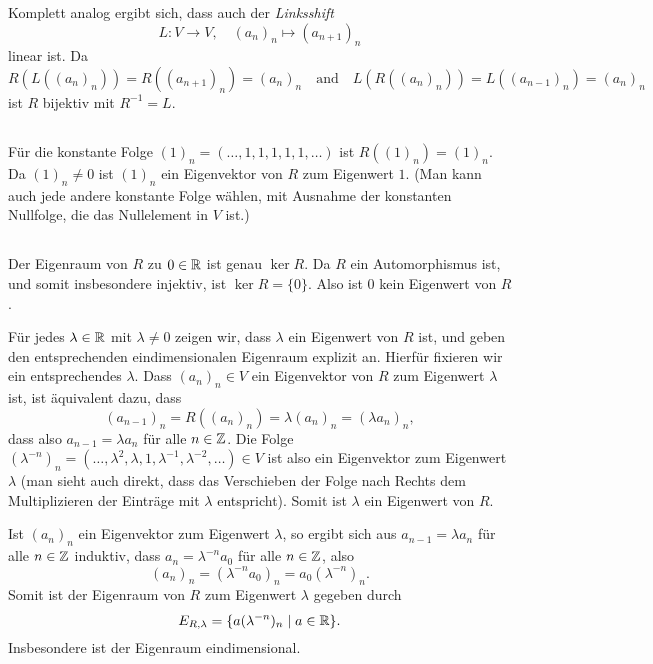 \documentclass[a4paper,10pt]{article}
\begin{document}
Komplett analog ergibt sich, dass auch der \emph{Linksshift}
\[
 L \colon V \to V, \quad (a_n)_n \mapsto (a_{n+1})_n
\]
linear ist. Da
\[
 R(L((a_n)_n))
 = R((a_{n+1})_n)
 = (a_n)_n
 \quad\text{and}\quad
 L(R((a_n)_n))
 = L((a_{n-1})_n)
 = (a_n)_n
\]
ist $R$ bijektiv mit $R^{-1} = L$.


\subsection{}
Für die konstante Folge $(1)_n = (\dotsc,1,1,1,1,1,\dotsc)$ ist $R((1)_n) = (1)_n$. Da $(1)_n \neq 0$ ist $(1)_n$ ein Eigenvektor von $R$ zum Eigenwert $1$. (Man kann auch jede andere konstante Folge wählen, mit Ausnahme der konstanten Nullfolge, die das Nullelement in $V$ ist.)


\subsection{}
Der Eigenraum von $R$ zu $0 \in \mathbb{R}$ ist genau $\ker R$. Da $R$ ein Automorphismus ist, und somit insbesondere injektiv, ist $\ker R = \{0\}$. Also ist $0$ kein Eigenwert von $R$.

Für jedes $\lambda \in \mathbb{R}$ mit $\lambda \neq 0$ zeigen wir, dass $\lambda$ ein Eigenwert von $R$ ist, und geben den entsprechenden eindimensionalen Eigenraum explizit an. Hierfür fixieren wir ein entsprechendes $\lambda$. Dass $(a_n)_n \in V$ ein Eigenvektor von $R$ zum Eigenwert $\lambda$ ist, ist äquivalent dazu, dass
\[
 (a_{n-1})_n
 = R((a_n)_n)
 = \lambda (a_n)_n
 = (\lambda a_n)_n,
\]
dass also $a_{n-1} = \lambda a_n$ für alle $n \in \mathbb{Z}$. Die Folge $(\lambda^{-n})_n = (\dotsc, \lambda^2, \lambda, 1, \lambda^{-1}, \lambda^{-2}, \dotsc) \in V$ ist also ein Eigenvektor zum Eigenwert $\lambda$ (man sieht auch direkt, dass das Verschieben der Folge nach Rechts dem Multiplizieren der Einträge mit $\lambda$ entspricht). Somit ist $\lambda$ ein Eigenwert von $R$.

Ist $(a_n)_n$ ein Eigenvektor zum Eigenwert $\lambda$, so ergibt sich aus $a_{n-1} = \lambda a_n$ für alle $n \in \mathbb{Z}$ induktiv, dass $a_n = \lambda^{-n} a_0$ für alle $n \in \mathbb{Z}$, also
\[
 (a_n)_n = (\lambda^{-n} a_0)_n = a_0 (\lambda^{-n})_n.
\]
Somit ist der Eigenraum von $R$ zum Eigenwert $\lambda$ gegeben durch
\[
 E_{R,\lambda} = \{a (\lambda^{-n})_n \mid a \in \mathbb{R}\}.
\]
Insbesondere ist der Eigenraum eindimensional.





\section{}
\end{document}
